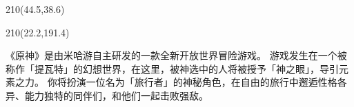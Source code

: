 \cleardoublepage %


\begin{textblock}{210}(44.5,38.6)
    \bfseries
    \makebox[28em][l]{\stutitle}
\end{textblock}

\begin{textblock}{210}(22.2,191.4)
    \bfseries
\end{textblock}

\begin{requirementtext}
    \par 《原神》是由米哈游自主研发的一款全新开放世界冒险游戏。
    游戏发生在一个被称作「提瓦特」的幻想世界，在这里，被神选中的人将被授予「神之眼」，导引元素之力。
    你将扮演一位名为「旅行者」的神秘角色，在自由的旅行中邂逅性格各异、能力独特的同伴们，和他们一起击败强敌。
\end{requirementtext}

\null\clearpage